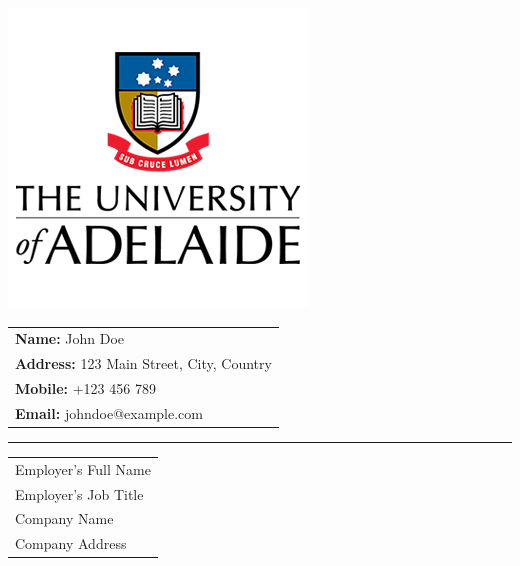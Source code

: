 \documentclass[11pt,a4paper]{article}
\begin{document}
\noindent
\begin{minipage}[c]{0.15\textwidth}
    \includegraphics[width=\textwidth]{uoa_logo.png} %
\end{minipage}%
\begin{minipage}[c]{0.9\textwidth}
    \hspace{1em} %
    \begin{tabular}{@{}l}
        \textbf{Name:} John Doe \\
        \textbf{Address:} 123 Main Street, City, Country \\
        \textbf{Mobile:} +123 456 789 \\
        \textbf{Email:} johndoe@example.com \\
    \end{tabular}
\end{minipage}

\vspace{1ex}
\noindent\color{black}\rule{\textwidth}{1.5pt}

\vspace{1em} %
\noindent
\begin{tabular}{@{}l}
    Employer's Full Name \\[1.2ex]
    Employer's Job Title \\[1.2ex]
    Company Name \\[1.2ex]
    Company Address \\[1.2ex]
\end{tabular}
\end{document}
